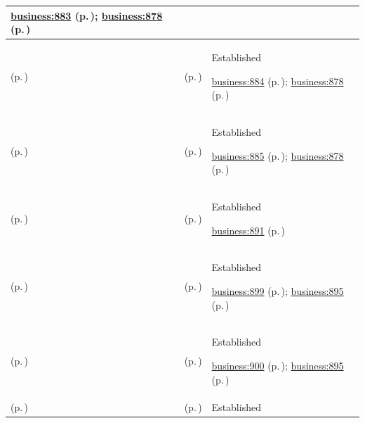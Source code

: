 \begin{longtable}{|>{\raggedright\arraybackslash}p{0.27\TableWidth}|>{\raggedright\arraybackslash}p{0.27\TableWidth}|>{\raggedright\arraybackslash}p{0.46\TableWidth}|}
 \hyperref[rad:business:880]{business:883} (p.\,\pageref{rad:business:880}); \hyperref[rad:business:878]{business:878} (p.\,\pageref{rad:business:878})\\\hline
\nameref{cap:bc-health-service-modelling} (p.\,\pageref{cap:bc-health-service-modelling}) & \nameref{cap:bc-health-service-implementation-support} (p.\,\pageref{cap:bc-health-service-implementation-support}) & Established

 \hyperref[rad:business:880]{business:884} (p.\,\pageref{rad:business:880}); \hyperref[rad:business:878]{business:878} (p.\,\pageref{rad:business:878})\\\hline
\nameref{cap:bc-health-service-modelling} (p.\,\pageref{cap:bc-health-service-modelling}) & \nameref{cap:bc-health-service-continuous-improvement} (p.\,\pageref{cap:bc-health-service-continuous-improvement}) & Established

 \hyperref[rad:business:880]{business:885} (p.\,\pageref{rad:business:880}); \hyperref[rad:business:878]{business:878} (p.\,\pageref{rad:business:878})\\\hline
\nameref{cap:bc-health-service-direction-stewardship} (p.\,\pageref{cap:bc-health-service-direction-stewardship}) & \nameref{cap:bc-health-service-alignment} (p.\,\pageref{cap:bc-health-service-alignment}) & Established

 \hyperref[rad:business:891]{business:891} (p.\,\pageref{rad:business:891})\\\hline
\nameref{cap:bc-health-service-alignment} (p.\,\pageref{cap:bc-health-service-alignment}) & \nameref{cap:bc-health-service-co-dependency-management} (p.\,\pageref{cap:bc-health-service-co-dependency-management}) & Established

 \hyperref[rad:business:897]{business:899} (p.\,\pageref{rad:business:897}); \hyperref[rad:business:895]{business:895} (p.\,\pageref{rad:business:895})\\\hline
\nameref{cap:bc-health-service-alignment} (p.\,\pageref{cap:bc-health-service-alignment}) & \nameref{cap:bc-health-service-resource-identification} (p.\,\pageref{cap:bc-health-service-resource-identification}) & Established

 \hyperref[rad:business:897]{business:900} (p.\,\pageref{rad:business:897}); \hyperref[rad:business:895]{business:895} (p.\,\pageref{rad:business:895})\\\hline
\nameref{cap:bc-health-service-alignment} (p.\,\pageref{cap:bc-health-service-alignment}) & \nameref{cap:bc-health-service-financial-management} (p.\,\pageref{cap:bc-health-service-financial-management}) & Established


\end{longtable}
